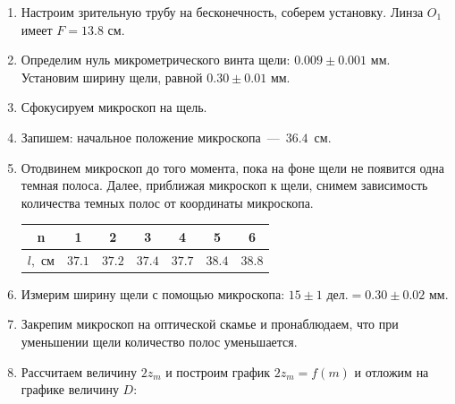 \documentclass[a4paper, 12pt]{article}
\begin{document}
\begin{enumerate}
    \item Настроим зрительную трубу на бесконечность, соберем установку. Линза $O_1$ имеет $F = 13.8$ см.

    \item Определим нуль микрометрического винта щели: $0.009 \pm 0.001$ мм. Установим ширину щели, равной $0.30 \pm 0.01$ мм.

    \item Сфокусируем микроскоп на щель.

    \item Запишем: начальное положение микроскопа~---~$36.4$~см.%

    \item Отодвинем микроскоп до того момента, пока на фоне щели не появится одна темная полоса. Далее, приближая микроскоп к щели, снимем зависимость количества темных полос от координаты микроскопа.
    
    \begin{tabular}{|c|c|c|c|c|c|c|} \hline
        n & 1 & 2 & 3 & 4 & 5 & 6\\ \hline
        $l, $ см & $37.1$ & $37.2$ & $37.4$ & $37.7$ & $38.4$ & $38.8$\\ \hline
    \end{tabular}

    \item Измерим ширину щели с помощью микроскопа: $15 \pm 1 \text{ дел.} = 0.30 \pm 0.02$ мм.

    \item Закрепим микроскоп на оптической скамье и пронаблюдаем, что при уменьшении щели количество полос уменьшается.

    \item Рассчитаем величину $2z_m$ и построим график $2z_m = f(m)$ и отложим на графике величину $D$:
     

\end{enumerate}
\end{document}
